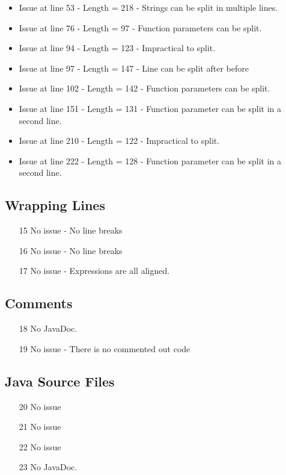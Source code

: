 \begin{itemize}
	\begin{itemize}
		\item Issue at line 53 - Length = 218 - Strings can be split in multiple lines.
		\item Issue at line 76 - Length = 97 - Function parameters can be split.
		\item Issue at line 94 - Length = 123 - Impractical to split.
		\item Issue at line 97 - Length = 147 - Line can be split after before \code{\&\&} 
		\item Issue at line 102 - Length = 142 - Function parameters can be split.
		\item Issue at line 151 - Length = 131 - Function parameter can be split in a second line.
		\item Issue at line 210 - Length = 122 - Impractical to split.
		\item Issue at line 222 - Length = 128 - Function parameter can be split in a second line.
	\end{itemize}
\end{itemize}
\subsection{Wrapping Lines}
\begin{itemize}
	\item[15] No issue - No line breaks
	\item[16] No issue - No line breaks
	\item[17] No issue - Expressions are all aligned.
\end{itemize}
\subsection{Comments}
\begin{itemize}
	\item[18] No JavaDoc.
	\item[19] No issue - There is no commented out code 
\end{itemize}
\subsection{Java Source Files}

\begin{itemize}
	\item[20] No issue
	\item[21] No issue
	\item[22] No issue
	\item[23] No JavaDoc.
\end{itemize}

